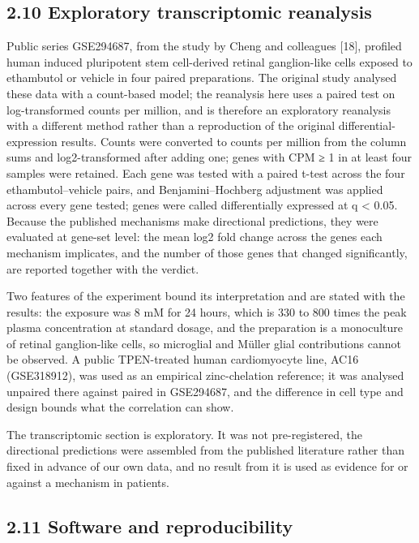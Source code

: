 \documentclass[12pt,a4paper]{article}
\begin{document}
\subsection*{2.10 Exploratory transcriptomic reanalysis}

Public series GSE294687, from the study by Cheng and colleagues [18], profiled human induced pluripotent stem cell-derived retinal ganglion-like cells exposed to ethambutol or vehicle in four paired preparations. The original study analysed these data with a count-based model; the reanalysis here uses a paired test on log-transformed counts per million, and is therefore an exploratory reanalysis with a different method rather than a reproduction of the original differential-expression results. Counts were converted to counts per million from the column sums and log2-transformed after adding one; genes with CPM ≥ 1 in at least four samples were retained. Each gene was tested with a paired t-test across the four ethambutol–vehicle pairs, and Benjamini–Hochberg adjustment was applied across every gene tested; genes were called differentially expressed at q < 0.05. Because the published mechanisms make directional predictions, they were evaluated at gene-set level: the mean log2 fold change across the genes each mechanism implicates, and the number of those genes that changed significantly, are reported together with the verdict.

Two features of the experiment bound its interpretation and are stated with the results: the exposure was 8 mM for 24 hours, which is 330 to 800 times the peak plasma concentration at standard dosage, and the preparation is a monoculture of retinal ganglion-like cells, so microglial and Müller glial contributions cannot be observed. A public TPEN-treated human cardiomyocyte line, AC16 (GSE318912), was used as an empirical zinc-chelation reference; it was analysed unpaired there against paired in GSE294687, and the difference in cell type and design bounds what the correlation can show.

The transcriptomic section is exploratory. It was not pre-registered, the directional predictions were assembled from the published literature rather than fixed in advance of our own data, and no result from it is used as evidence for or against a mechanism in patients.

\subsection*{2.11 Software and reproducibility}
\end{document}
